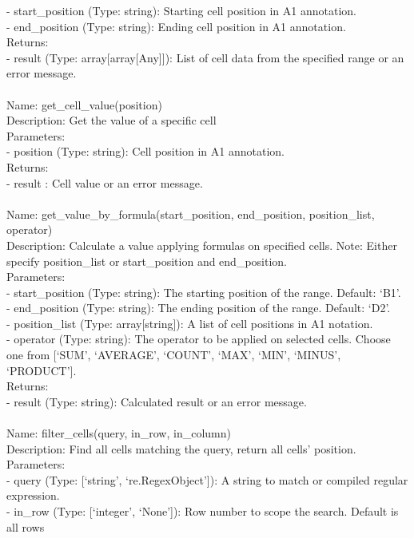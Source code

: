 \begin{tcolorbox}[breakable,title=Prompt Details for Sheet]
- start\_position (Type: string): Starting cell position in A1 annotation.\\
- end\_position (Type: string): Ending cell position in A1 annotation.\\
Returns:\\
- result (Type: array[array[Any]]): List of cell data from the specified range or an error message.\\
\\
Name: get\_cell\_value(position)\\
Description: Get the value of a specific cell\\
Parameters:\\
- position (Type: string): Cell position in A1 annotation.\\
Returns:\\
- result : Cell value or an error message.\\
\\
Name: get\_value\_by\_formula(start\_position, end\_position, position\_list, operator)\\
Description: Calculate a value applying formulas on specified cells. Note: Either specify position\_list or start\_position and end\_position.\\
Parameters:\\
- start\_position (Type: string): The starting position of the range. Default: `B1'.\\
- end\_position (Type: string): The ending position of the range. Default: `D2'.\\
- position\_list (Type: array[string]): A list of cell positions in A1 notation.\\
- operator (Type: string): The operator to be applied on selected cells. Choose one from [`SUM', `AVERAGE', `COUNT', `MAX', `MIN', `MINUS', `PRODUCT'].\\
Returns:\\
- result (Type: string): Calculated result or an error message.\\
\\
Name: filter\_cells(query, in\_row, in\_column)\\
Description: Find all cells matching the query, return all cells' position.\\
Parameters:\\
- query (Type: [`string', `re.RegexObject']): A string to match or compiled regular expression.\\
- in\_row (Type: [`integer', `None']): Row number to scope the search. Default is all rows\\

\end{tcolorbox}
